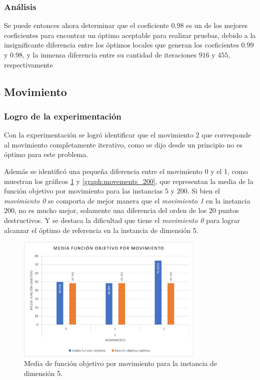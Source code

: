 \subsubsection{Análisis}

Se puede entonces ahora determinar que el coeficiente $0.98$ es un de los mejores coeficientes para encontrar un óptimo aceptable para realizar pruebas, debido a la insignificante diferencia entre los óptimos locales que generan los coeficientes $0.99$ y $0.98$, y la inmensa diferencia entre su cantidad de iteraciones $916$ y $455$, respectivamente

\subsection{Movimiento}

\subsubsection{Logro de la experimentación}

Con la experimentación se logró identificar que el movimiento 2 que corresponde al movimiento completamente iterativo, como se dijo desde un principio no es óptimo para este problema.

Además se identificó una pequeña diferencia entre el movimiento 0 y el 1, como muestran los gráficos \ref{graph:movements_5} y \ref{graph:movements_200}, que representan la media de la función objetivo por movimiento para las instancias $5$ y $200$. Si bien el \textit{movimiento 0} se comporta de mejor manera que el \textit{movimiento 1} en la instancia $200$, no es mucho mejor, solamente una diferencia del orden de los $20$ puntos destructivos. Y se destaca la dificultad que tiene el \textit{movimiento 0} para lograr alcanzar el óptimo de referencia en la instancia de dimensión 5.


\begin{figure}[!ht]
    \centering
    \includegraphics[width=0.8\textwidth]{images/testing/media_por_movimiento_5.png}
    \caption{Media de función objetivo por movimiento para la instancia de dimensión 5.}
    \label{graph:movements_5}
\end{figure}

